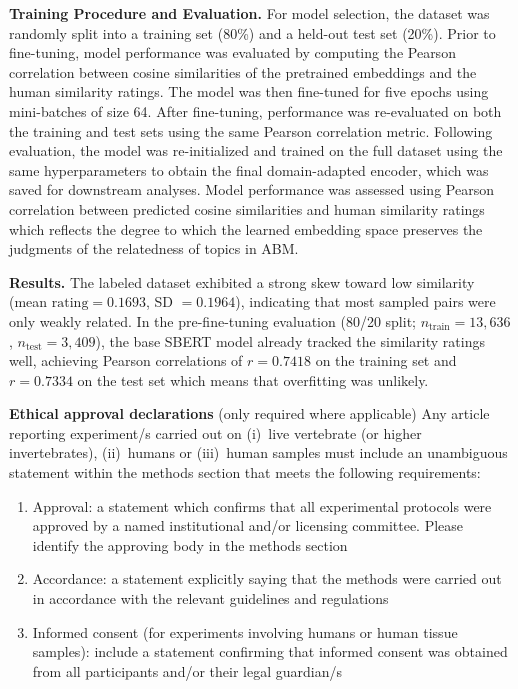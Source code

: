 \documentclass[pdflatex,sn-mathphys-num]{sn-jnl}%
\theoremstyle{thmstyleone}%
\theoremstyle{thmstyletwo}%
\theoremstyle{thmstylethree}%
\begin{document}
\vspace{0.75em}

\textbf{Training Procedure and Evaluation.}
For model selection, the dataset was randomly split into a training set (80\%) and a held-out test set (20\%). Prior to fine-tuning, model performance was evaluated by computing the Pearson correlation between cosine similarities of the pretrained embeddings and the human similarity ratings. The model was then fine-tuned for five epochs using mini-batches of size 64. After fine-tuning, performance was re-evaluated on both the training and test sets using the same Pearson correlation metric. Following evaluation, the model was re-initialized and trained on the full dataset using the same hyperparameters to obtain the final domain-adapted encoder, which was saved for downstream analyses. Model performance was assessed using Pearson correlation between predicted cosine similarities and human similarity ratings which reflects the degree to which the learned embedding space preserves the judgments of the relatedness of topics in ABM.

\vspace{0.75em}

\textbf{Results.}
The labeled dataset exhibited a strong skew toward low similarity (mean $\text{rating}=0.1693$, SD $=0.1964$), indicating that most sampled pairs were only weakly related. In the pre-fine-tuning evaluation (80/20 split; $n_{\text{train}}=13{,}636$, $n_{\text{test}}=3{,}409$), the base SBERT model already tracked the similarity ratings well, achieving Pearson correlations of $r=0.7418$ on the training set and $r=0.7334$ on the test set which means that overfitting was unlikely.


\vspace{10em}

\textbf{Ethical approval declarations} (only required where applicable) Any article reporting experiment/s carried out on (i)~live vertebrate (or higher invertebrates), (ii)~humans or (iii)~human samples must include an unambiguous statement within the methods section that meets the following requirements: 

\begin{enumerate}[1.]
\item Approval: a statement which confirms that all experimental protocols were approved by a named institutional and/or licensing committee. Please identify the approving body in the methods section

\item Accordance: a statement explicitly saying that the methods were carried out in accordance with the relevant guidelines and regulations

\item Informed consent (for experiments involving humans or human tissue samples): include a statement confirming that informed consent was obtained from all participants and/or their legal guardian/s
\end{enumerate}
\end{document}
